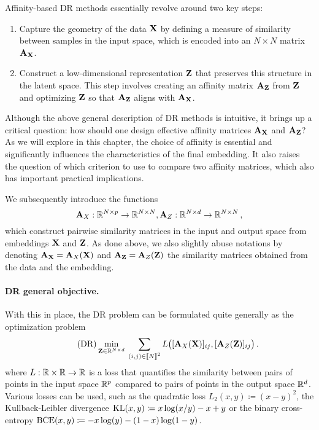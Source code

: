 Affinity-based DR methods essentially revolve around two key steps:

\begin{enumerate}
    \item Capture the geometry of the data ${\mathbf{X}}$ by defining a measure of similarity between samples in the input space, which is encoded into an $N \times N$ matrix ${\mathbf{A}}_{{\mathbf{X}}}$.
    \item Construct a low-dimensional representation ${\mathbf{Z}}$ that preserves this structure in the latent space. This step involves creating an affinity matrix ${\mathbf{A}}_{{\mathbf{Z}}}$ from ${\mathbf{Z}}$ and optimizing ${\mathbf{Z}}$ so that ${\mathbf{A}}_{{\mathbf{Z}}}$ aligns with ${\mathbf{A}}_{{\mathbf{X}}}$.
\end{enumerate}

Although the above general description of DR methods is intuitive, it brings up a critical question: how should one design effective affinity matrices ${\mathbf{A}}_{{\mathbf{X}}}$ and ${\mathbf{A}}_{{\mathbf{Z}}}$? As we will explore in this chapter, the choice of affinity is essential and significantly influences the characteristics of the final embedding. It also raises the question of which criterion to use to compare two affinity matrices, which also has important practical implications.

We subsequently introduce the functions
\begin{equation}
\label{eq:sim_function}
{\mathbf{A}}_{X}: \mathbb{R}^{N \times p} \to \mathbb{R}^{N \times N}, {\mathbf{A}}_{Z}: \mathbb{R}^{N \times d} \to \mathbb{R}^{N \times N}\,,
\end{equation}
which construct pairwise similarity matrices in the input and output space from embeddings ${\mathbf{X}}$ and ${\mathbf{Z}}$. As done above, we also slightly abuse notations by denoting ${\mathbf{A}}_{\mathbf{X}} = {\mathbf{A}}_{X}({\mathbf{X}})$ and ${\mathbf{A}}_{\mathbf{Z}} = {\mathbf{A}}_{Z}({\mathbf{Z}})$ the similarity matrices obtained from the data and the embedding.
 
\paragraph{DR general objective.} With this in place, the DR problem can be formulated quite generally as the optimization problem
\begin{equation}
\label{eq:DR_criterion}\tag{DR}
\min_{\mZ \in \R^{N \times d}} \: \sum_{(i,j) \in \integ{N}^2}  L\big([\simiX(\mX)]_{ij}, [\simi(\mZ)]_{ij}\big) \,. %
\end{equation}
where $L:\mathbb{R} \times \mathbb{R} \rightarrow \mathbb{R}$ is a loss that quantifies the similarity between pairs of points in the input space $\mathbb{R}^{p}$ compared to pairs of points in the output space $\mathbb{R}^{d}$. Various losses can be used, such as the quadratic loss $L_2(x,y) \coloneqq (x - y)^2$, the Kullback-Leibler divergence $\operatorname{KL}(x,y) \coloneqq x \log (x/y) - x +y$ or the binary cross-entropy $\operatorname{BCE}(x,y) \coloneqq -x \log(y) - (1-x) \log(1-y)$.


